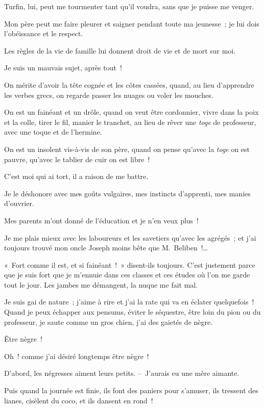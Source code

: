 \documentclass[french,twoside]{book} %
\begin{document}
Turfin, lui, peut me tourmenter tant qu’il voudra, sans que je puisse me venger.\par
Mon père peut me faire pleurer et saigner pendant toute ma jeunesse ; je lui dois l’obéissance et le respect.\par
Les règles de la vie de famille lui donnent droit de vie et de mort sur moi.\par
Je suis un mauvais sujet, après tout !\par
On mérite d’avoir la tête cognée et les côtes cassées, quand, au lieu d’apprendre les verbes grecs, on regarde passer les nuages ou voler les mouches.\par
On est un fainéant et un drôle, quand on veut être cordonnier, vivre dans la poix et la colle, tirer le fil, manier le tranchet, au lieu de rêver une \emph{toge} de professeur, avec une toque et de l’hermine.\par
On est un insolent vis-à-vis de son père, quand on pense qu’avec la\emph{ toge} on est pauvre, qu’avec le tablier de cuir on est libre !\par
C’est moi qui ai tort, il a raison de me battre.\par
Je le déshonore avec mes goûts vulgaires, mes instincts d’apprenti, mes manies d’ouvrier.\par
Mes parents m’ont donné de l’éducation et je n’en veux plus !\par
Je me plais mieux avec les laboureurs et les savetiers qu’avec les agrégés ; et j’ai toujours trouvé mon oncle Joseph moins bête que M. Beliben !…\par
« Fort comme il est, et si fainéant ! » disent-ils toujours. C’est justement parce que je suis fort que je m’ennuie dans ces classes et ces études où l’on me garde tout le jour. Les jambes me démangent, la nuque me fait mal.\par
Je suis gai de nature ; j’aime à rire et j’ai la rate qui va en éclater quelquefois ! Quand je peux échapper aux pensums, éviter le séquestre, être loin du pion ou du professeur, je saute comme un gros chien, j’ai des gaietés de nègre.\par
Être nègre !\par
Oh ! comme j’ai désiré longtemps être nègre !\par
D’abord, les négresses aiment leurs petits. – J’aurais eu une mère aimante.\par
Puis quand la journée est finie, ils font des paniers pour s’amuser, ils tressent des lianes, cisèlent du coco, et ils dansent en rond !\par
\end{document}

